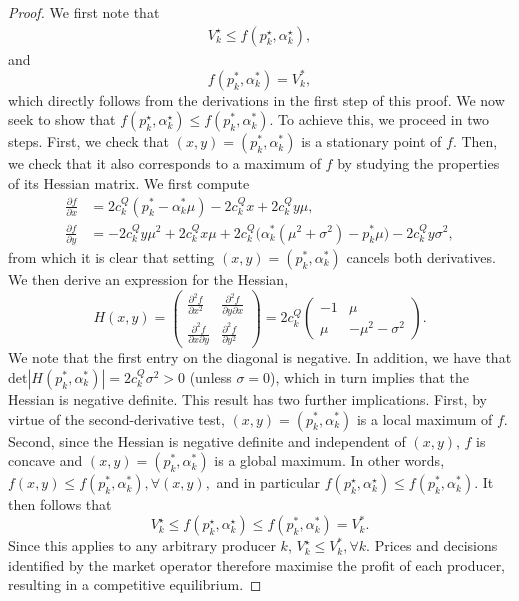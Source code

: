 \documentclass{article}
\begin{document}
\begin{proof}
We first note that
\begin{align*}
V_k^\star \le f(p_k^\star, \alpha_k^\star),
\end{align*} 
and
\begin{equation*}
f(p_k^*, \alpha_k^*) = V_k^*,
\end{equation*}
which directly follows from the derivations in the first step of this proof. We now seek to show that $f(p_k^\star, \alpha_k^\star) \le f(p_k^*, \alpha_k^*)$. To achieve this, we proceed in two steps. First, we check that $(x, y) = (p_k^*, \alpha_k^*)$ is a stationary point of $f$. Then, we check that it also corresponds to a maximum of $f$ by studying the properties of its Hessian matrix. We first compute
\begin{align*}
\frac{\partial f}{\partial x} &= 2c_k^Q(p_k^* - \alpha_k^*\mu) - 2 c_k^Q x + 2c_k^Q y \mu,\\
\frac{\partial f}{\partial y} &= - 2c_k^Q y \mu^2 + 2 c_k^Q x \mu + 2c_k^Q\big(\alpha_k^*(\mu^2 + \sigma^2) - p_k^* \mu\big) - 2c_k^Q y \sigma^2,
\end{align*}
from which it is clear that setting $(x, y) = (p_k^*, \alpha_k^*)$ cancels both derivatives. We then derive an expression for the Hessian,
\begin{equation*}
H(x,y) = \begin{pmatrix} \frac{\partial^2 f}{\partial x^2} & \frac{\partial^2 f}{\partial y \partial x} \\ \frac{\partial^2 f}{\partial x \partial y} & \frac{\partial^2 f}{\partial y^2} \end{pmatrix} = 2c_k^Q \begin{pmatrix} -1 & \mu \\ \mu & -\mu^2 - \sigma^2 \end{pmatrix}.
\end{equation*}
We note that the first entry on the diagonal is negative. In addition, we have that $\mbox{det}|H(p_k^*, \alpha_k^*)| = 2 c_k^Q \sigma^2 > 0$ (unless $\sigma = 0$), which in turn implies that the Hessian is negative definite. This result has two further implications. First, by virtue of the second-derivative test, $(x, y) = (p_k^*, \alpha_k^*)$ is a local maximum of $f$. Second, since the Hessian is negative definite and independent of $(x, y)$, $f$ is concave and $(x, y) = (p_k^*, \alpha_k^*)$ is a global maximum. In other words, $f(x, y) \le f(p_k^*, \alpha_k^*), \forall (x, y),$ and in particular $ f(p_k^\star, \alpha_k^\star) \le f(p_k^*, \alpha_k^*)$. It then follows that
\begin{equation*}
V_k^\star \le f(p_k^\star, \alpha_k^\star) \le f(p_k^*, \alpha_k^*) = V_k^*.
\end{equation*}
Since this applies to any arbitrary producer $k$, $V_k^\star \le V_k^*, \forall k$. Prices and decisions identified by the market operator therefore maximise the profit of each producer, resulting in a competitive equilibrium.
\end{proof}
\end{document}
